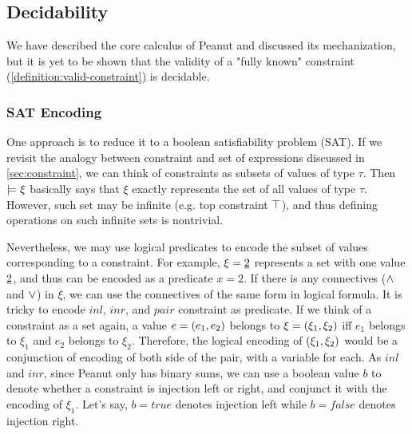 \subsection{Decidability}
\label{sec:decidability}
 We have described the core calculus of Peanut and discussed its mechanization, but it is yet to be shown that the validity of a "fully known" constraint (\autoref{definition:valid-constraint}) is decidable.
\subsubsection{SAT Encoding}
 One approach is to reduce it to a boolean satisfiability problem (SAT). 
If we revisit the analogy between constraint and set of expressions discussed in \autoref{sec:constraint}, we can think of constraints as subsets of values of type $\tau$.
Then $\models \xi$ basically says that $\xi$ exactly represents the set of all values of type $\tau$. 
However, such set may be infinite (e.g. top constraint $\top$),
and thus defining operations on such infinite sets is nontrivial. 

Nevertheless, we may use logical predicates to encode the subset of values corresponding to a constraint. 
For example, $\xi=\underline{2}$ represents a set with one value $\underline{2}$, and thus can be encoded as a predicate $x=2$. 
If there is any connectives ($\wedge$ and $\vee$) in $\xi$, we can use the connectives of the same form in logical formula. 
It is tricky to encode $inl$, $inr$, and $pair$ constraint as predicate. 
If we think of a constraint as a set again, a value $e=(e_1 , e_2)$ belongs to $\xi=(\xi_1 , \xi_2)$ iff $e_1$ belongs to $\xi_1$ and $e_2$ belongs to $\xi_2$. 
Therefore, the logical encoding of $(\xi_1 , \xi_2)$ would be a conjunction of encoding of both side of the pair, with a variable for each.
As $inl$ and $inr$, since Peanut only has binary sums, we can use a boolean value $b$ to denote whether a constraint is injection left or right, and conjunct it with the encoding of $\xi_1$. Let's say, $b=true$ denotes injection left while $b=false$ denotes injection right.

